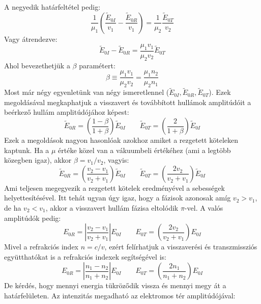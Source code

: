 \documentclass[../main.tex]{subfiles}
\begin{document}
A negyedik határfeltétel pedig:
\begin{equation}
    \frac{1}{\mu_1} \left( \frac{\tilde{E}_{0I}}{v_1} - \frac{\tilde{E}_{0R}}{v_1} \right) = \frac{1}{\mu_2} \frac{\tilde{E}_{0T}}{v_2}
\end{equation}
Vagy átrendezve:
\begin{equation}
    \tilde{E}_{0I} - \tilde{E}_{0R} = \frac{\mu_1 v_1}{\mu_2 v_2} \tilde{E}_{0T}
\end{equation}
Ahol bevezethetjük a $\beta$ paramétert:
\begin{equation}
    \beta \equiv \frac{\mu_1 v_1}{\mu_2 v_2} = \frac{\mu_1 n_2}{\mu_2 n_1}
\end{equation}
Most már négy egyenletünk van négy ismeretlennel ($\tilde{E}_{0I}, \tilde{E}_{0R}, \tilde{E}_{0T}$). Ezek megoldásával megkaphatjuk a visszavert és továbbított hullámok amplitúdóit a beérkező hullám amplitúdójához képest:
\begin{equation}
    \tilde{E}_{0R} = \left(\frac{1 - \beta}{1 + \beta}\right) \tilde{E}_{0I} \qquad \tilde{E}_{0T} = \left(\frac{2}{1 + \beta}\right) \tilde{E}_{0I}
\end{equation}
Ezek a megoldások nagyon hasonlóak azokhoz amiket a rezgetett köteleken kaptunk. Ha a $\mu$ értéke közel van a vákuumbeli értékéhez (ami a legtöbb közegben igaz), akkor $\beta = v_1/v_2$, vagyis:
\begin{equation}
    \tilde{E}_{0R} = \left(\frac{v_2 - v_1}{v_2 + v_1}\right) \tilde{E}_{0I} \qquad \tilde{E}_{0T} = \left(\frac{2 v_2}{v_2 + v_1}\right) \tilde{E}_{0I}
\end{equation}
Ami teljesen megegyezik a rezgetett kötelek eredményével a sebességek helyettesítésével. Itt tehát ugyan úgy igaz, hogy a fázisok azonosak amíg $v_2 > v_1$, de ha $v_2 < v_1$, akkor a visszavert hullám fázisa eltolódik $\pi$-vel.
A valós amplitúdók pedig:
\begin{equation}
    E_{0R} = \left|\frac{v_2 - v_1}{v_2 + v_1}\right| E_{0I} \qquad E_{0T} = \left(\frac{2 v_2}{v_2 + v_1}\right) E_{0I}
\end{equation}
Mivel a refrakciós index $n = c/v$, ezért felírhatjuk a visszaverési és transzmissziós együtthatókat is a refrakciós indexek segítségével is:
\begin{equation}
    E_{0R} = \left|\frac{n_1 - n_2}{n_1 + n_2}\right| E_{0I} \qquad E_{0T} = \left(\frac{2 n_1}{n_1 + n_2}\right) E_{0I}
\end{equation}
De kérdés, hogy mennyi energia tükröződik vissza és mennyi megy át a határfelületen. Az intenzitás megadható az elektromos tér amplitúdójával:
\end{document}
